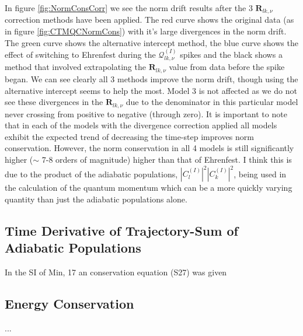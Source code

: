 In figure \ref{fig:NormConsCorr} we see the norm drift results after the 3 $\mathbf{R}_{lk, \nu}$ correction methods have been applied. The red curve shows the original data (as in figure \ref{fig:CTMQCNormCons}) with it's large divergences in the norm drift. The green curve shows the alternative intercept method, the blue curve shows the effect of switching to Ehrenfest during the $\mathcal{Q}_{lk, \nu}^{(I)}$ spikes and the black shows a method that involved extrapolating the $\mathbf{R}_{lk, \nu}$ value from data before the spike began. We can see clearly all 3 methods improve the norm drift, though using the alternative intercept seems to help the most. Model 3 is not affected as we do not see these divergences in the $\mathbf{R}_{lk, \nu}$ due to the denominator in this particular model never crossing from positive to negative (through zero). It is important to note that in each of the models with the divergence correction applied all models exhibit the expected trend of decreasing the time-step improves norm conservation. However, the norm conservation in all 4 models is still significantly higher ($\sim$ 7-8 orders of magnitude) higher than that of Ehrenfest. I think this is due to the product of the adiabatic populations, $|C_{l}^{(I)}|^2 |C_{k}^{(I)}|^2$, being used in the calculation of the quantum momentum which can be a more quickly varying quantity than just the adiabatic populations alone.

\subsection{Time Derivative of Trajectory-Sum of Adiabatic Populations}
In the SI of Min, 17 \cite{min_ab_2017} an conservation equation (S27) was given 

\subsection{Energy Conservation}
...
